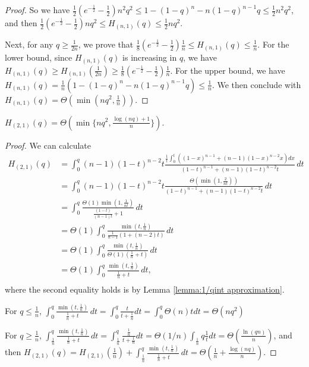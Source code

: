 \begin{proof}
   So we have $\frac12(e^{-\frac12}-\frac12)n^2q^2\leq 1 - (1-q)^n - n(1-q)^{n-1} q\leq\frac12n^2q^2$, and then $\frac12(e^{-\frac12}-\frac12)nq^2\leq H_{(n,1)}(q)\leq\frac12nq^2$.

   Next, for any $q\geq\frac1{2n}$, we prove that $\frac18(e^{-\frac12}-\frac12)\frac{1}{n}\leq H_{(n,1)}(q)\leq \frac1n$.
   For the lower bound, since $H_{(n,1)}(q)$ is increasing in $q$, we have $H_{(n,1)}(q)\geq H_{(n,1)}(\frac1{2n})\geq \frac18(e^{-\frac12}-\frac12)\frac{1}{n}$.
   For the upper bound, we have $H_{(n,1)}(q)=\frac1n\left( 1 - (1-q)^n - n(1-q)^{n-1} q\right)\leq \frac1n$. We then conclude with $H_{(n,1)}(q)=\Theta(\min(nq^2,\frac1{n}))$.
\end{proof}

\begin{lemma}\label{lem:H21}
    $H_{(2,1)}(q)=\Theta(\min\{nq^2,\frac{\log(nq)+1}{n}\})$.
\end{lemma}
\begin{proof}
We can calculate
\begin{align*}
H_{(2,1)}(q) &= \int_0^q (n-1) (1-t)^{n-2} t \frac{ \frac{1}{t} \int_0^t \left( (1-x)^{n-1} + (n-1) (1-x)^{n-2} x \right) dx }{(1-t)^{n-1} + (n-1) (1-t)^{n-2} t} \, dt \\
&= \int_0^q (n-1) (1-t)^{n-2} t \frac{\Theta\left( \min\left( 1, \frac{2}{nt} \right) \right)}{(1-t)^{n-1} + (n-1) (1-t)^{n-2} t} \, dt\\
&= \int_0^q \frac{\Theta(1) \min\left( 1, \frac{1}{nt} \right) }{\frac{(1-t)}{(n-1)t}  + 1} \, dt\\
&= \Theta(1) \int_0^q \frac{\min\left(t, \frac{1}{n} \right)}{\frac{1}{n-1}(1+(n-2)t)} \, dt \\
&= \Theta(1) \int_0^q \frac{\min\left( t, \frac{1}{n} \right)}{\Theta(1)(\frac{1}{n} + t)} \, dt \\
&= \Theta(1) \int_0^q \frac{\min\left( t, \frac{1}{n} \right)}{\frac{1}{n} + t} \, dt, \\
\end{align*}
where the second equality holds is by Lemma \ref{lemma:1/qint approximation}.

For $q \leq \frac{1}{n}$, $\int_0^q \frac{\min\left( t, \frac{1}{n} \right)}{\frac{1}{n} + t} \, dt=\int_0^q\frac{t}{t+\frac1n}dt=\int_0^q\Theta(n)tdt=\Theta(nq^2)$

For $q \geq \frac{1}{n}$, $\int_{\frac1n}^q \frac{\min\left( t, \frac{1}{n} \right)}{\frac{1}{n} + t} \, dt=\int_{\frac1n}^q\frac{\frac1n}{t+\frac1n}dt=\Theta(1/n)\int_{\frac1n}{q}\frac1tdt=\Theta(\frac{\ln(qn)}{n})$, and then $H_{(2,1)}(q)=H_{(2,1)}(\frac1n)+\int_{\frac1n}^q \frac{\min\left( t, \frac{1}{n} \right)}{\frac{1}{n} + t} \, dt=\Theta(\frac{1}{n}+\frac{\log(nq)}{n})$.
\end{proof}

